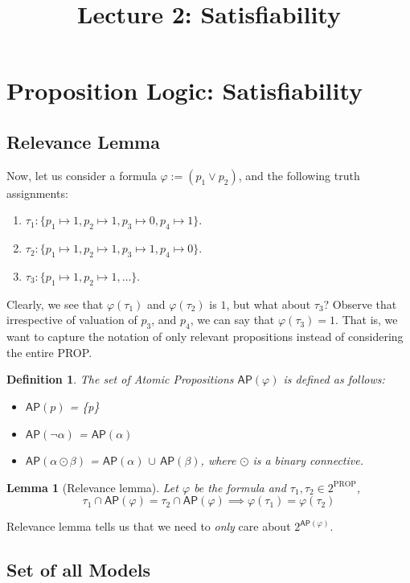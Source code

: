 \documentclass{article}
\newtheorem{lemma}[theorem]{Lemma}
\newtheorem{definition}[theorem]{Definition}
\newcommand{\ap}[1]{\ensuremath{\mathsf{AP}{#1}}}
\begin{document}
\title{Lecture 2: Satisfiability}

\section{Proposition Logic: Satisfiability}

\subsection{Relevance Lemma}
Now, let us consider a formula $\varphi:= (p_1 \lor p_2)$, and the following truth assignments:
\begin{enumerate}
	\item $\tau_1: \{p_1 \mapsto 1, p_2 \mapsto 1, p_3 \mapsto 0, p_4 \mapsto 1 \}$.
	\item $\tau_2: \{p_1 \mapsto 1, p_2 \mapsto 1, p_3 \mapsto 1, p_4 \mapsto 0 \}$.
	\item $\tau_3: \{p_1 \mapsto 1, p_2 \mapsto 1, \ldots\}$.
\end{enumerate}

Clearly, we see that $\varphi(\tau_1)$ and $\varphi(\tau_2)$ is $1$, but what about $\tau_3$? Observe that irrespective of valuation of $p_3$, and $p_4$, we can say that $\varphi(\tau_3) = 1$. That is, we want to capture the notation of only relevant propositions instead of considering the entire PROP.

\begin{definition}
	The set of Atomic Propositions \ap{(\varphi)} is defined as follows:
	\begin{itemize}
		\item \ap{(p)} = \{p\}
		\item \ap{(\lnot \alpha)} = \ap{(\alpha)}
		\item \ap{(\alpha \odot \beta)} = \ap{(\alpha)} $\cup$ \ap{(\beta)},  where $\odot$ is a binary connective.
	\end{itemize}
\end{definition}

\begin{lemma}[Relevance lemma]
	Let $\varphi$ be the formula and $\tau_1, \tau_2 \in 2^{\text{PROP}}$, $$\tau_1 \cap \ap{(\varphi)} = \tau_2 \cap \ap{(\varphi)} \implies \varphi(\tau_1) = \varphi(\tau_2)$$
\end{lemma}

Relevance lemma tells us that we need to \textit{only} care about $2^{\ap{(\varphi)}}$.

\subsection{Set of all Models}
\end{document}
